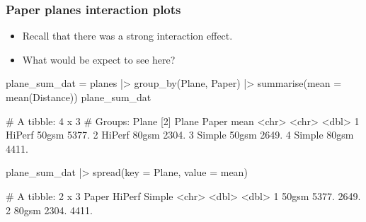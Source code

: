 \documentclass[a4paper]{article}\usepackage[]{graphicx}\usepackage[]{xcolor}
\begin{document}
\subsubsection{Paper planes interaction plots}
\begin{itemize}
	\item Recall that there was a strong interaction effect.
	\item What would be expect to see here?
\end{itemize}
\begin{minipage}[t]{0.49\textwidth}
\begin{Schunk}
\begin{Sinput}
plane_sum_dat = planes |> 
  group_by(Plane, Paper) |> 
  summarise(mean = mean(Distance))
plane_sum_dat
\end{Sinput}
\begin{Soutput}
# A tibble: 4 x 3
# Groups:   Plane [2]
  Plane  Paper  mean
  <chr>  <chr> <dbl>
1 HiPerf 50gsm 5377.
2 HiPerf 80gsm 2304.
3 Simple 50gsm 2649.
4 Simple 80gsm 4411.
\end{Soutput}
\end{Schunk}
\end{minipage}
\hspace{0.02\textwidth}
\begin{minipage}[t]{0.49\textwidth}
\begin{Schunk}
\begin{Sinput}
plane_sum_dat |> 
  spread(key = Plane, value = mean)
\end{Sinput}
\begin{Soutput}
# A tibble: 2 x 3
  Paper HiPerf Simple
  <chr>  <dbl>  <dbl>
1 50gsm  5377.  2649.
2 80gsm  2304.  4411.
\end{Soutput}
\end{Schunk}
\end{minipage}
\end{document}
